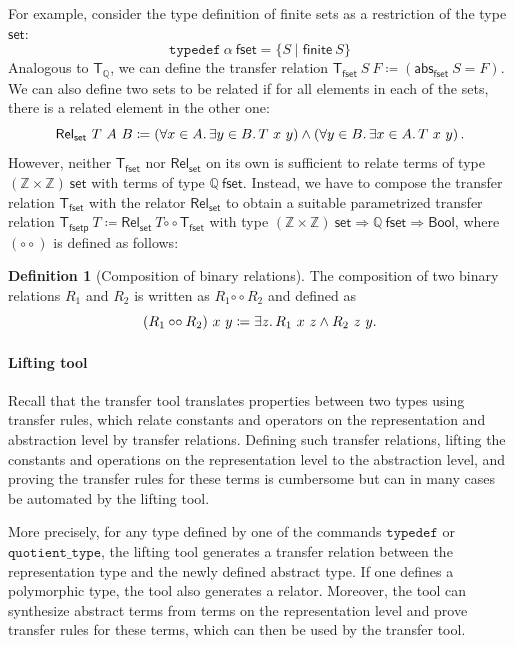 \documentclass{article}
\theoremstyle{definition}
\newtheorem{definition}{Definition}[section]
\newcommand{\relcomp}{\mathbin{\circ\circ}}
\newcommand{\bool}{\mathsf{Bool}}
\newcommand{\inte}{\mathbb{Z}}
\newcommand{\rat}{\mathbb{Q}}
\newcommand{\abs}{\mathsf{abs}}
\begin{document}
For example, consider the type definition of finite sets as a restriction of the type \(\mathsf{set}\):
\begin{equation*}
	\mathtt{typedef}\ \alpha\ \mathsf{fset} = \{S \mid \mathsf{finite}\ S\}
\end{equation*}
Analogous to \(\mathsf{T_\rat}\), we can define the transfer relation \(\mathsf{T_{fset}}\ S\ F \coloneqq (\abs_\mathsf{fset}\ S = F)\).
We can also define two sets to be related
if for all elements in each of the sets,
there is a related element in the other one:
\begin{equation*}
	\mathsf{Rel_{set}}\ T\ A\ B \coloneqq (\forall x \in A\ldotp \exists y \in B\ldotp T\ x\ y) \land  (\forall y \in B\ldotp \exists x \in A\ldotp T\ x\ y)\,.
\end{equation*}
However, neither \(\mathsf{T_{fset}}\) nor \(\mathsf{Rel_{set}}\) on its own
is sufficient to relate terms of type \((\inte \times \inte)\ \mathsf{set}\) with terms of type \(\rat\ \mathsf{fset}\).
Instead, we have to compose the transfer relation \(\mathsf{T_{fset}}\) with the relator \(\mathsf{Rel_{set}}\)
to obtain a suitable parametrized transfer relation \(\mathsf{T_{fset p}}\ T \coloneqq \mathsf{Rel_{set}}\ T \relcomp \mathsf{T_{fset}}\)
with type \((\inte \times \inte)\ \mathsf{set} \Rightarrow \rat\ \mathsf{fset} \Rightarrow \bool \),
where $(\relcomp)$ is defined as follows:
\begin{definition}[Composition of binary relations]
	The composition of two binary relations \(R_1\) and \(R_2\) is written as \(R_1 \relcomp R_2\) and defined as
	\begin{equation}
		(R_1 \relcomp R_2)\ x\ y \coloneqq \exists z\ldotp R_1\ x\ z \land R_2\ z\ y.
	\end{equation}
\end{definition}

\paragraph{Lifting tool} Recall that the transfer tool translates properties between two types using transfer rules, which relate constants and operators on the representation and abstraction level by transfer relations.
Defining such transfer relations,
lifting the constants and operations on the representation level to the abstraction level,
and proving the transfer rules for these terms
is cumbersome but can in many cases be automated by the lifting tool.

More precisely, for any type defined by one of the commands \(\mathtt{typedef}\) or \(\mathtt{quotient\_type}\),
the lifting tool generates a transfer relation between the representation type and the newly defined abstract type.
If one defines a polymorphic type,
the tool also generates a relator.
Moreover, the tool can synthesize abstract terms from terms on the representation level and prove transfer rules for these terms,
which can then be used by the transfer tool.
\end{document}
